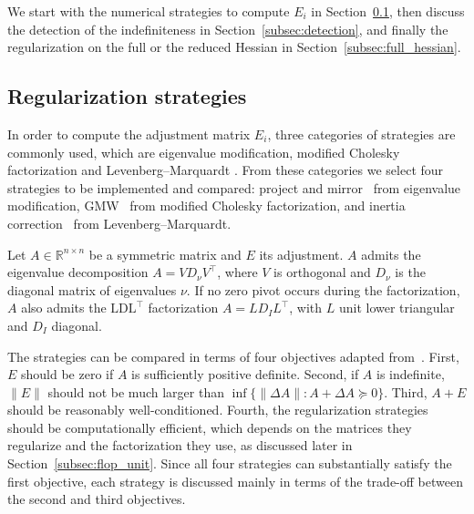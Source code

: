 \documentclass[class=scrbook, crop=false]{standalone}
\begin{document}
We start with the numerical strategies to compute $E_i$ in Section~\ref{subsec:reg_strategies},
then discuss the detection of the indefiniteness in Section~\ref{subsec:detection},
and finally the regularization on the full or the reduced Hessian in Section~\ref{subsec:full_hessian}.

\subsection{Regularization strategies}
\label{subsec:reg_strategies}
In order to compute the adjustment matrix $E_i$, three categories of strategies are commonly used,
which are eigenvalue modification, modified Cholesky factorization and Levenberg--Marquardt
\cite{nocedal2006numerical, mcsweeneyModifiedCholeskyDecomposition2017, More1978levenberg}.
From these categories we select four strategies to be implemented and compared:
project and mirror~\cite{verschueren2017sparsity} from eigenvalue modification,
\gls{GMW}~\cite{gill1981practical} from modified Cholesky factorization,
and inertia correction~\cite{wachter2006implementation} from Levenberg--Marquardt.

Let $A \in \mathbb{R}^{n\times n}$ be a symmetric matrix and $E$ its adjustment.
$A$ admits the eigenvalue decomposition $A = V D_\nu V^\top$,
where $V$ is orthogonal and $D_\nu$ is the diagonal matrix of eigenvalues $\nu$.
If no zero pivot occurs during the factorization, 
$A$ also admits the $\mathrm{LDL}^\top$ factorization $A = L D_I L^\top$,
with $L$ unit lower triangular and $D_I$ diagonal.

The strategies can be compared in terms of four objectives adapted from~\cite{fangModifiedCholeskyAlgorithms2007}.
First, $E$ should be zero if $A$ is sufficiently positive definite.
Second, if $A$ is indefinite, $\|E\|$ should not be much larger than
$\inf\{\|\Delta A\| : A + \Delta A \succeq 0\}$.
Third, $A + E$ should be reasonably well-conditioned.
Fourth, the regularization strategies should be computationally efficient,
which depends on the matrices they regularize and the factorization they use, 
as discussed later in Section~\ref{subsec:flop_unit}.
Since all four strategies can substantially satisfy the first objective,
each strategy is discussed mainly in terms of the trade-off between the second and third objectives.
\end{document}
